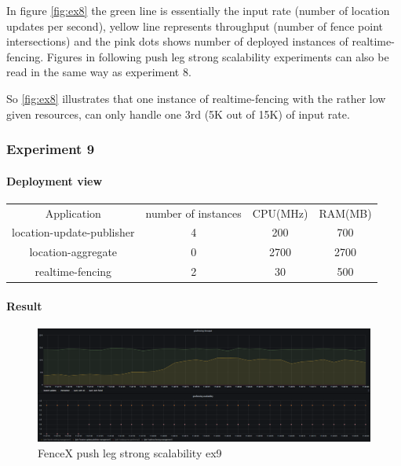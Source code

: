 \documentclass[a4]{report}
\begin{document}
        In figure \ref{fig:ex8} the green line is essentially the input rate (number of location updates per second),
        yellow line represents throughput (number of fence point intersections) and the pink dots shows number of
        deployed instances of realtime-fencing.
        Figures in following push leg strong scalability experiments can also be read in the same way as experiment 8.

        So \ref{fig:ex8} illustrates that one instance of realtime-fencing with the rather low given resources, can only
        handle one 3rd (5K out of 15K) of input rate.

        \subsubsection{Experiment 9}

        \paragraph{Deployment view}
        \begin{center}
            \begin{tabular}{ c c c c }
                Application               & number of instances & CPU(MHz) & RAM(MB) \\
                location-update-publisher & 4                   & 200      & 700     \\
                location-aggregate        & 0                   & 2700     & 2700    \\
                realtime-fencing          & 2                   & 30       & 500     \\
            \end{tabular}
        \end{center}

        \paragraph{Result}
        \begin{figure}[ht]
            \caption{FenceX push leg strong scalability ex9}
            \label{fig:ex9}
            \includegraphics[scale=0.4]{images/evaluation/ex9-benchmarking-ongoing-2per4sec.png}
        \end{figure}
\end{document}
